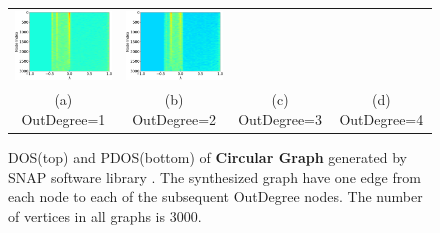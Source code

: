 \documentclass[senior,final,11pt]{iscs-thesis}
\begin{document}
\begin{figure}[htbp]
\begin{tabular}{cccc}
      \includegraphics[width=45mm]{figure/circular_graph_3000_3.txt_pdos.png} &
      \includegraphics[width=45mm]{figure/circular_graph_3000_4.txt_pdos.png}  \\
      (a) OutDegree=1 & (b) OutDegree=2 & (c) OutDegree=3 & (d) OutDegree=4\\ [6pt]
    \end{tabular}
    \caption{DOS(top) and PDOS(bottom) of {\bf Circular Graph} generated by SNAP software library \cite{leskovec2016snap}. The synthesized graph have one edge from each node to each of the subsequent OutDegree nodes. The number of vertices in all graphs is 3000.}
    \label{fig:circular}
\end{figure}
\end{document}
